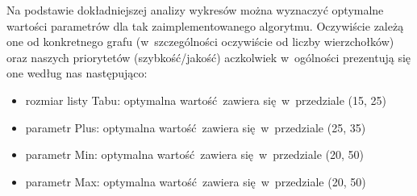 \documentclass[11pt,a4paper]{article}
\begin{document}
Na podstawie dokładniejszej analizy wykresów można wyznaczyć optymalne wartości parametrów dla tak zaimplementowanego algorytmu. Oczywiście zależą one od konkretnego grafu (w~szczególności oczywiście od liczby wierzchołków) oraz naszych priorytetów (szybkość/jakość) aczkolwiek w~ogólności prezentują się one według nas następująco:
\begin{itemize}
  \item rozmiar listy Tabu: optymalna wartość zawiera się w~przedziale (15, 25)
  \item parametr Plus: optymalna wartość zawiera się w~przedziale (25, 35)
  \item parametr Min: optymalna wartość zawiera się w~przedziale (20, 50)
  \item parametr Max: optymalna wartość zawiera się w~przedziale (20, 50)
\end{itemize}

{}

\end{document}
